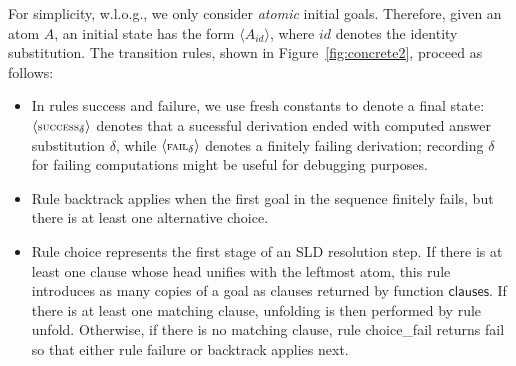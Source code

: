 \documentclass[fleqn]{tlp}
\newcommand{\id}{{\mathit{id}}}
\newcommand{\clauses}{\mathsf{clauses}}
\newcommand{\success}{\mbox{\footnotesize \textsc{success}}}
\newcommand{\failsc}{\mbox{\footnotesize \textsc{fail}}}
\def \tuple#1{\langle #1 \rangle}
\begin{document}
For simplicity, w.l.o.g., we only consider \emph{atomic} initial
goals. Therefore, given an atom $A$, an initial state has the form
$\tuple{A_\id}$, where $\id$ denotes the identity substitution.
The transition rules, shown in Figure~\ref{fig:concrete2}, proceed as
follows:
\begin{itemize}
\item In rules \textsf{success} and \textsf{failure}, we use fresh
  constants to denote a final state: $\tuple{\success_\delta}$ denotes
  that a sucessful derivation ended with computed answer substitution
  $\delta$, while $\tuple{\failsc_\delta}$ denotes a finitely failing
  derivation; recording $\delta$ for failing computations might be
  useful for debugging purposes.

\item Rule \textsf{backtrack} applies when the first goal in the
  sequence finitely fails, but there is at least one alternative
  choice. 

\item Rule \textsf{choice} represents the first stage of an SLD
  resolution step. If there is at least one clause whose head unifies
  with the leftmost atom, this rule introduces as many copies of a
  goal as clauses returned by function $\clauses$. If there is at
  least one matching clause, unfolding is then performed by rule
  \textsf{unfold}. Otherwise, if there is no matching clause, rule
  \textsf{choice\_fail} returns \textsf{fail} so that either rule
  \textsf{failure} or \textsf{backtrack} applies next.

\end{itemize}
\end{document}
